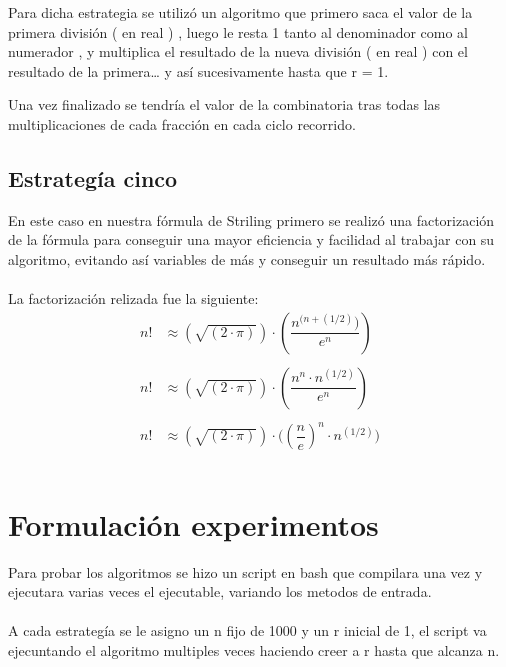 \documentclass[12pt,letterpaper]{scrartcl}
\begin{document}
Para dicha estrategia se utilizó un algoritmo que primero saca el valor de la primera división ( en real ) , luego le resta 1 tanto al denominador como al numerador , y multiplica el resultado de la nueva división ( en real ) con el resultado de la primera… y así sucesivamente hasta que r = 1.

Una vez finalizado se tendría el valor de la combinatoria tras todas las multiplicaciones de cada fracción en cada ciclo recorrido.

\subsection{Estrategía cinco}

En este caso en nuestra fórmula de Striling primero se realizó una factorización de la fórmula para conseguir una mayor eficiencia y facilidad al trabajar con su algoritmo, evitando así
variables de más y conseguir un resultado más rápido.\\\\
La factorización relizada fue la siguiente:
\\
\[\begin{matrix}

{n!} &\approx {( \sqrt{(2 \cdot \pi)} )}\cdot{(\dfrac{n^{(n+(1/2)})}{e^n})}\\

&\\

{n!} &\approx {( \sqrt{(2 \cdot \pi)} )}\cdot{( \dfrac{ n^n \cdot n^{(1/2)} }{ e^n })}\\

&\\

{n!} &\approx {( \sqrt{(2 \cdot \pi)} )}\cdot{( ( \dfrac{ n }{ e } )^n }\cdot{ n^{(1/2)} )}\\

&\\

\end{matrix}
\]
\section{Formulación experimentos}

Para probar los algoritmos se hizo un script en bash que compilara una vez y ejecutara varias veces el ejecutable, variando los metodos de entrada. 
\\\\
A cada estrategía se le asigno un n fijo de 1000 y un r inicial de 1, el script va ejecuntando el algoritmo multiples veces haciendo creer a r hasta que alcanza n.
\end{document}
